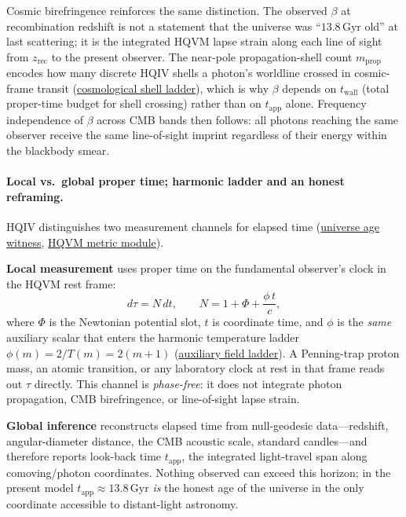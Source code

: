 \documentclass[11pt]{amsart}
\begin{document}
Cosmic birefringence reinforces the same distinction. The observed $\beta$ at recombination redshift is not a statement that the universe was ``$13.8\,\mathrm{Gyr}$ old'' at last scattering; it is the integrated HQVM lapse strain along each line of sight from $z_{\mathrm{rec}}$ to the present observer. The near-pole propagation-shell count $m_{\mathrm{prop}}$ encodes how many discrete HQIV shells a photon's worldline crossed in cosmic-frame transit (\hyperref[lean:cosmological-shell-ladder]{cosmological shell ladder}), which is why $\beta$ depends on $t_{\mathrm{wall}}$ (total proper-time budget for shell crossing) rather than on $t_{\mathrm{app}}$ alone. Frequency independence of $\beta$ across CMB bands then follows: all photons reaching the same observer receive the same line-of-sight imprint regardless of their energy within the blackbody smear.

\paragraph{Local vs.\ global proper time; harmonic ladder and an honest reframing.}
HQIV distinguishes two measurement channels for elapsed time (\hyperref[lean:universe-age]{universe age witness}, \hyperref[lean:hqvm-metric]{HQVM metric module}).

\textbf{Local measurement} uses proper time on the fundamental observer's clock in the HQVM rest frame:
\[
  d\tau = N\,dt,
  \qquad
  N = 1 + \Phi + \frac{\phi\, t}{c},
\]
where $\Phi$ is the Newtonian potential slot, $t$ is coordinate time, and $\phi$ is the \emph{same} auxiliary scalar that enters the harmonic temperature ladder $\phi(m)=2/T(m)=2(m+1)$ (\hyperref[lean:auxiliary-field]{auxiliary field ladder}). A Penning-trap proton mass, an atomic transition, or any laboratory clock at rest in that frame reads out $\tau$ directly. This channel is \emph{phase-free}: it does not integrate photon propagation, CMB birefringence, or line-of-sight lapse strain.

\textbf{Global inference} reconstructs elapsed time from null-geodesic data---redshift, angular-diameter distance, the CMB acoustic scale, standard candles---and therefore reports look-back time $t_{\mathrm{app}}$, the integrated light-travel span along comoving/photon coordinates. Nothing observed can exceed this horizon; in the present model $t_{\mathrm{app}}\approx 13.8\,\mathrm{Gyr}$ \emph{is} the honest age of the universe in the only coordinate accessible to distant-light astronomy.
\end{document}
